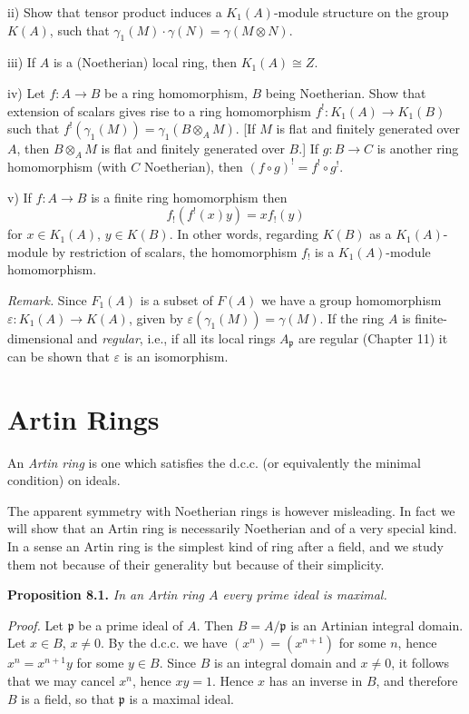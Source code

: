 ii) Show that tensor product induces a \(K_1(A)\)-module structure on the group \(K(A)\), such that \(\gamma_1(M)\cdot\gamma(N)=\gamma(M\otimes N)\).

iii) If \(A\) is a (Noetherian) local ring, then \(K_1(A)\cong Z\).

iv) Let \(f:A\to B\) be a ring homomorphism, \(B\) being Noetherian. Show that extension of scalars gives rise to a ring homomorphism \(f^!:K_1(A)\to K_1(B)\) such that \(f^!(\gamma_1(M))=\gamma_1(B\otimes_A M)\). [If \(M\) is flat and finitely generated over \(A\), then \(B\otimes_A M\) is flat and finitely generated over \(B\).] If \(g:B\to C\) is another ring homomorphism (with \(C\) Noetherian), then \((f\circ g)^!=f^!\circ g^!\).

v) If \(f:A\to B\) is a finite ring homomorphism then
\[
f_!(f^!(x)y)=xf_!(y)
\]
for \(x\in K_1(A)\), \(y\in K(B)\). In other words, regarding \(K(B)\) as a \(K_1(A)\)-module by restriction of scalars, the homomorphism \(f_!\) is a \(K_1(A)\)-module homomorphism.

\noindent\emph{Remark.} Since \(F_1(A)\) is a subset of \(F(A)\) we have a group homomorphism \(\varepsilon:K_1(A)\to K(A)\), given by \(\varepsilon(\gamma_1(M))=\gamma(M)\). If the ring \(A\) is finite-dimensional and \emph{regular}, i.e., if all its local rings \(A_\mathfrak p\) are regular (Chapter 11) it can be shown that \(\varepsilon\) is an isomorphism.

\section{Artin Rings}

An \emph{Artin ring} is one which satisfies the d.c.c. (or equivalently the minimal condition) on ideals.

The apparent symmetry with Noetherian rings is however misleading. In fact we will show that an Artin ring is necessarily Noetherian and of a very special kind. In a sense an Artin ring is the simplest kind of ring after a field, and we study them not because of their generality but because of their simplicity.

\noindent\textbf{Proposition 8.1.} \emph{In an Artin ring \(A\) every prime ideal is maximal.}

\noindent\emph{Proof.} Let \(\mathfrak p\) be a prime ideal of \(A\). Then \(B=A/\mathfrak p\) is an Artinian integral domain. Let \(x\in B\), \(x\neq0\). By the d.c.c. we have \((x^n)=(x^{n+1})\) for some \(n\), hence \(x^n=x^{n+1}y\) for some \(y\in B\). Since \(B\) is an integral domain and \(x\neq0\), it follows that we may cancel \(x^n\), hence \(xy=1\). Hence \(x\) has an inverse in \(B\), and therefore \(B\) is a field, so that \(\mathfrak p\) is a maximal ideal. \proofbox

